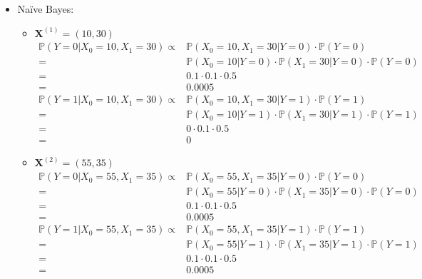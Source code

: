 \documentclass[twoside,11pt]{article}
\begin{document}
\begin{itemize}
    \item Na\"ive Bayes:
    \begin{itemize}
    \item{$\mathbf{X}^{(1)}=(10,30)$}
     \begin{equation*}
     \begin{aligned}
      \mathbb{P}(Y=0|X_0=10, X_1=30)\propto&\mathbb{P}(X_0=10,X_1=30|Y=0)\cdot\mathbb{P}(Y=0)\\
     =&\mathbb{P}(X_0=10|Y=0)\cdot\mathbb{P}(X_1=30|Y=0)\cdot\mathbb{P}(Y=0)\\
     =&0.1\cdot0.1\cdot0.5\\
     =&0.0005
     \end{aligned}
     \end{equation*}
     \begin{equation*}
     \begin{aligned}
      \mathbb{P}(Y=1|X_0=10, X_1=30)\propto&\mathbb{P}(X_0=10,X_1=30|Y=1)\cdot\mathbb{P}(Y=1)\\
     =&\mathbb{P}(X_0=10|Y=1)\cdot\mathbb{P}(X_1=30|Y=1)\cdot\mathbb{P}(Y=1)\\     
     =&0\cdot0.1\cdot0.5\\
     =&0
     \end{aligned}
     \end{equation*}

    \item{$\mathbf{X}^{(2)}=(55,35)$}
     \begin{equation*}
     \begin{aligned}
      \mathbb{P}(Y=0|X_0=55, X_1=35)\propto&\mathbb{P}(X_0=55,X_1=35|Y=0)\cdot\mathbb{P}(Y=0)\\
     =&\mathbb{P}(X_0=55|Y=0)\cdot\mathbb{P}(X_1=35|Y=0)\cdot\mathbb{P}(Y=0)\\
     =&0.1\cdot0.1\cdot0.5\\
     =&0.0005
     \end{aligned}
     \end{equation*}
     \begin{equation*}
     \begin{aligned}
      \mathbb{P}(Y=1|X_0=55, X_1=35)\propto&\mathbb{P}(X_0=55,X_1=35|Y=1)\cdot\mathbb{P}(Y=1)\\
     =&\mathbb{P}(X_0=55|Y=1)\cdot\mathbb{P}(X_1=35|Y=1)\cdot\mathbb{P}(Y=1)\\
     =&0.1\cdot0.1\cdot0.5\\
     =&0.0005
     \end{aligned}
     \end{equation*}
    \end{itemize}



\end{itemize}
\end{document}
